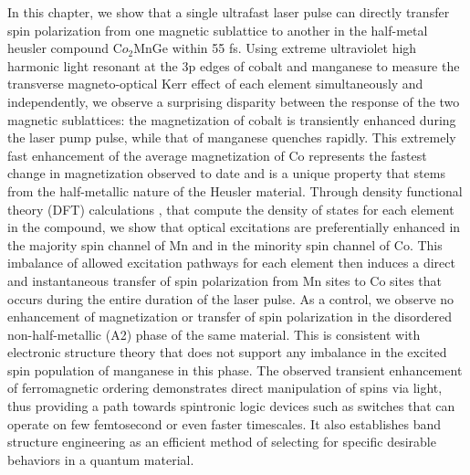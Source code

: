 In this chapter, we show that a single ultrafast laser pulse can directly transfer spin polarization from one magnetic sublattice to another in the half-metal heusler compound C$o_2$MnGe within 55 fs. Using extreme ultraviolet high harmonic light resonant at the 3p edges of cobalt and manganese to measure the transverse magneto-optical Kerr effect of each element simultaneously and independently, we observe a surprising disparity between the response of the two magnetic sublattices: the magnetization of cobalt is transiently enhanced during the laser pump pulse, while that of manganese quenches rapidly. This extremely fast enhancement of the average magnetization of Co represents the fastest change in magnetization observed to date and is a unique property that stems from the half-metallic nature of the Heusler material. Through density functional theory (DFT) calculations \cite{Hohenberg1964,KOHN1965}, that compute the density of states for each element in the compound, we show that optical excitations are preferentially enhanced in the majority spin channel of Mn and in the minority spin channel of Co. This imbalance of allowed excitation pathways for each element then induces a direct and instantaneous transfer of spin polarization from Mn sites to Co sites that occurs during the entire duration of the laser pulse. As a control, we observe no enhancement of magnetization or transfer of spin polarization in the disordered non-half-metallic (A2) phase of the same material. This is consistent with electronic structure theory that does not support any imbalance in the excited spin population of manganese in this phase. The observed transient enhancement of ferromagnetic ordering demonstrates direct manipulation of spins via light, thus providing a path towards spintronic logic devices such as switches that can operate on few femtosecond or even faster timescales. It also establishes band structure engineering as an efficient method of selecting for specific desirable behaviors in a quantum material.

